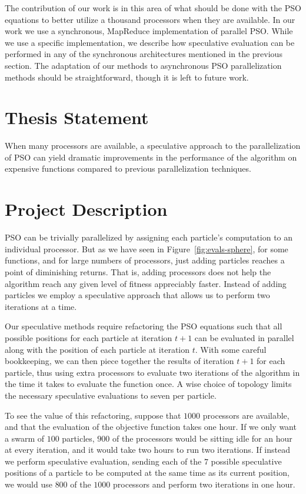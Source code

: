 \documentclass[ms]{byuprop}
\newcommand{\figref}[1]{Figure~\ref{fig:#1}}
\begin{document}
The contribution of our work is in this area of what should be done with the
PSO equations to better utilize a thousand processors when they are available.
In our work we use a synchronous, MapReduce implementation of parallel PSO.
While we use a specific implementation, we describe how speculative evaluation
can be performed in any of the synchronous architectures mentioned in the
previous section.  The adaptation of our methods to asynchronous PSO
parallelization methods should be straightforward, though it is left to future
work.

\section{Thesis Statement}

When many processors are available, a speculative approach to the
parallelization of PSO can yield dramatic improvements in the performance of
the algorithm on expensive functions compared to previous parallelization
techniques.


\section{Project Description}

PSO can be trivially parallelized by assigning each particle's computation to
an individual processor.  But as we have seen in \figref{evals-sphere}, for
some functions, and for large numbers of processors, just adding particles
reaches a point of diminishing returns.  That is, adding processors does not
help the algorithm reach any given level of fitness appreciably faster.
Instead of adding particles we employ a speculative approach that allows us to
perform two iterations at a time.

Our speculative methods require refactoring the PSO equations such that all
possible positions for each particle at iteration $t+1$ can be evaluated in
parallel along with the position of each particle at iteration $t$.  With some
careful bookkeeping, we can then piece together the results of iteration $t+1$
for each particle, thus using extra processors to evaluate two iterations of
the algorithm in the time it takes to evaluate the function once.  A wise
choice of topology limits the necessary speculative evaluations to seven per
particle.

To see the value of this refactoring, suppose that $1000$ processors are
available, and that the evaluation of the objective function takes one hour.
If we only want a swarm of $100$ particles, $900$ of the processors would be
sitting idle for an hour at every iteration, and it would take two hours to run
two iterations.  If instead we perform speculative evaluation, sending each of
the $7$ possible speculative positions of a particle to be computed at the same
time as its current position, we would use $800$ of the $1000$ processors and
perform two iterations in one hour.
\end{document}
